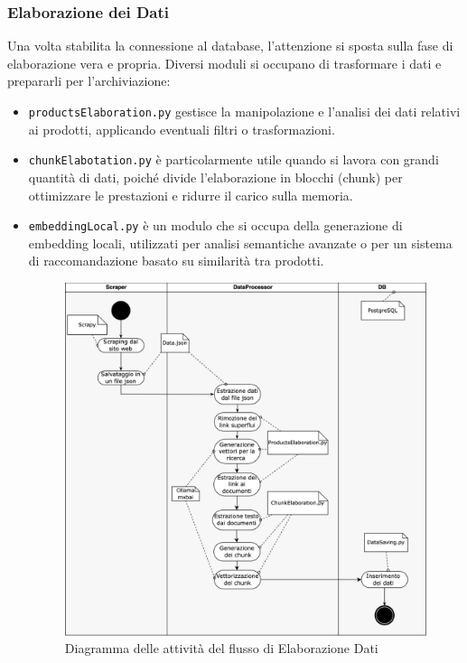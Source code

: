 \subsubsection{Elaborazione dei Dati}
Una volta stabilita la connessione al database, l'attenzione si sposta sulla fase di elaborazione vera e propria. Diversi moduli si occupano di trasformare i dati e prepararli per l'archiviazione:

\begin{itemize}
 

\item \texttt{productsElaboration.py} gestisce la manipolazione e l'analisi dei dati relativi ai prodotti, applicando eventuali filtri o trasformazioni.

\item \texttt{chunkElabotation.py} è particolarmente utile quando si lavora con grandi quantità di dati, poiché divide l'elaborazione in blocchi (chunk) per ottimizzare le prestazioni e ridurre il carico sulla memoria.

\item \texttt{embeddingLocal.py} è un modulo che si occupa della generazione di embedding locali,  utilizzati per analisi semantiche avanzate o per un sistema di raccomandazione basato su similarità tra prodotti.

\begin{figure}[H]
    \centering
    \includegraphics[width=\textwidth]{images/flussoSalvataggioDati.png}
    \caption{Diagramma delle attivit\`a del flusso di Elaborazione Dati}
    \label{fig:architettura}
\end{figure}

\end{itemize}
